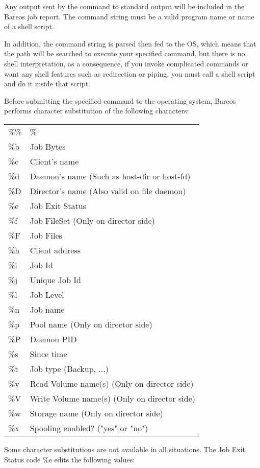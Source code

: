 {Any output sent by the command to standard output will be included in the
Bareos job report.  The command string must be a valid program name or name
of a shell script.

In addition, the command string is parsed then fed to the OS,
which means that the path will be searched to execute your specified
command, but there is no shell interpretation, as a consequence, if you
invoke complicated commands or want any shell features such as redirection
or piping, you must call a shell script and do it inside that script.

Before submitting the specified command to the operating system, Bareos
performs character substitution of the following characters:

\label{character substitution}
\footnotesize
\begin{longtable}{ l l }
    \%\% & \% \\
    \%b & Job Bytes \\
    \%c & Client's name \\
    \%d & Daemon's name (Such as host-dir or host-fd) \\
    \%D & Director's name (Also valid on file daemon) \\
    \%e & Job Exit Status \\
    \%f & Job FileSet (Only on director side) \\
    \%F & Job Files \\
    \%h & Client address \\
    \%i & Job Id \\
    \%j & Unique Job Id \\
    \%l & Job Level \\
    \%n & Job name \\
    \%p & Pool name (Only on director side) \\
    \%P & Daemon PID \\
    \%s & Since time \\
    \%t & Job type (Backup, ...) \\
    \%v & Read Volume name(s) (Only on director side) \\
    \%V & Write Volume name(s) (Only on director side) \\
    \%w & Storage name (Only on director side) \\
    \%x & Spooling enabled? ("yes" or "no") \\
\end{longtable}
\normalsize

Some character substitutions are not available in all situations. The Job Exit
Status code \%e edits the following values:

}
